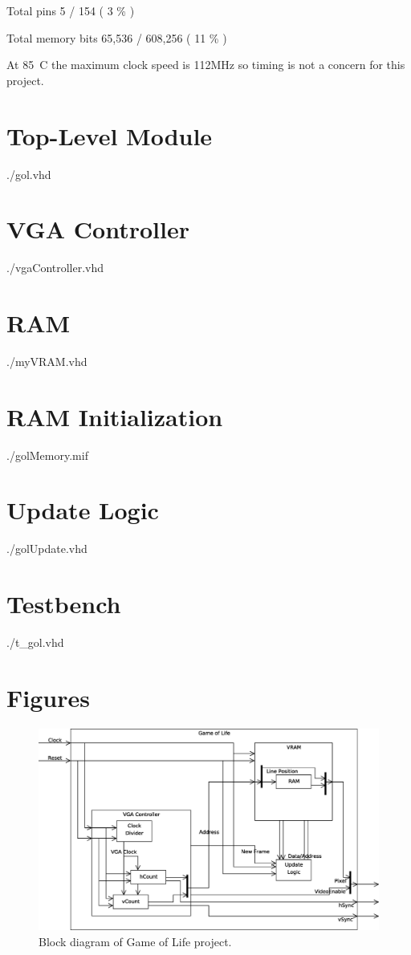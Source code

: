 \documentclass[twoside, letterpaper]{report}
\begin{document}
Total pins	5 / 154 ( 3 \% )

Total memory bits	65,536 / 608,256 ( 11 \% )
\newline
\par
At 85\degree~C the maximum clock speed is 112MHz so timing is not a concern for this project.

\chapter{Top-Level Module}
 {./gol.vhd}

\chapter{VGA Controller}
 {./vgaController.vhd}

\chapter{RAM}
 {./myVRAM.vhd}

\chapter{RAM Initialization}
 {./golMemory.mif}

\chapter{Update Logic}
 {./golUpdate.vhd}

\chapter{Testbench}
 {./t_gol.vhd}

\chapter{Figures}
\begin{figure}
\centering
\includegraphics[width=7in]{./media/golBlockDiagram.eps}
\caption{\label{fig:block}Block diagram of Game of Life project.}
\end{figure}
\end{document}
